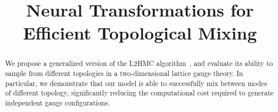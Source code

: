 \documentclass{article} %
\title{Neural Transformations for \\Efficient Topological Mixing}%
\author{Sam Foreman, Xiao-Yong Jin\& James Osborn\thanks{\hyperref{%
      https://github.com/saforem2/l2hmc-qcd
   }{https://github.com/saforem2/l2hmc-qcd} \\
   Leadership Computing Facility\\
   Argonne National Laboratory\\
   Lemont, IL 60439
   \texttt{\{foremans,xjin,\}@anl.gov},%
   \texttt{\{osborn\}@alcf.anl.gov}\\
}}
\begin{document}
\maketitle

\begin{abstract}
   We propose a generalized version of the L2HMC algorithm~\citep{levy2017}, and evaluate its ability to sample from
   different topologies in a two-dimensional lattice gauge theory.
   In particular, we demonstrate that our model is able to successfully mix between modes of different topology,
   significantly reducing the computational cost required to generate independent gauge configurations.
\end{abstract}

%
\end{document}
